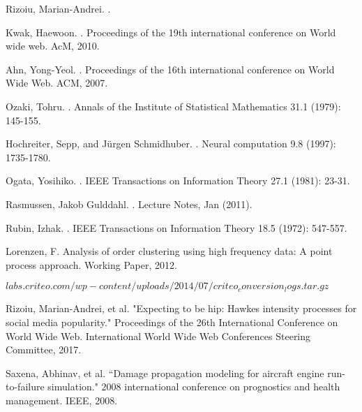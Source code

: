 \documentclass[10pt,letterpaper]{article}
\begin{document}
\begin{thebibliography}{10}
Rizoiu, Marian-Andrei.
.

Kwak, Haewoon.
.
\newblock Proceedings of the 19th international conference on World wide web. AcM, 2010.

Ahn, Yong-Yeol.
.
\newblock Proceedings of the 16th international conference on World Wide Web. ACM, 2007.

Ozaki, Tohru.
.
\newblock Annals of the Institute of Statistical Mathematics 31.1 (1979): 145-155.

Hochreiter, Sepp, and Jürgen Schmidhuber.
.
\newblock Neural computation 9.8 (1997): 1735-1780.

Ogata, Yosihiko.
.
\newblock IEEE Transactions on Information Theory 27.1 (1981): 23-31. 

Rasmussen, Jakob Gulddahl.
.
\newblock Lecture Notes, Jan (2011).

Rubin, Izhak.
.
\newblock IEEE Transactions on Information Theory 18.5 (1972): 547-557.

\newblock Lorenzen, F. Analysis of order clustering using high frequency data: A point process approach. Working Paper, 2012.

$labs.criteo.com/wp-content/uploads/2014/07/criteo_conversion_logs.tar.gz$

Rizoiu, Marian-Andrei, et al. "Expecting to be hip: Hawkes intensity processes for social media popularity." Proceedings of the 26th International Conference on World Wide Web. International World Wide Web Conferences Steering Committee, 2017. 

Saxena, Abhinav, et al. “Damage propagation modeling for aircraft engine run-to-failure simulation." 2008 international conference on prognostics and health management. IEEE, 2008.


\end{thebibliography}
\end{document}
